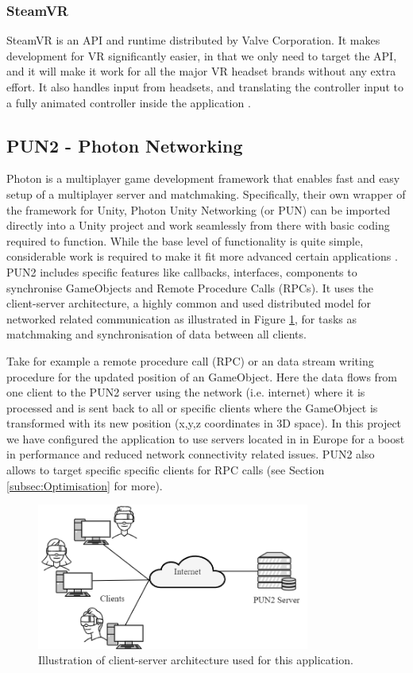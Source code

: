 \subsubsection{SteamVR}
SteamVR is an API and runtime distributed by Valve Corporation. It makes development for VR significantly easier, in that we only need to target the API, and it will make it work for all the major VR headset brands without any extra effort. It also handles input from headsets, and translating the controller input to a fully animated controller inside the application \cite{steamVR}\cite{steamVRAPI}.

\subsection{PUN2 - Photon Networking}
\label{section:pun2}
Photon is a multiplayer game development framework that enables fast and easy setup of a multiplayer server and matchmaking. Specifically, their own wrapper of the framework for Unity, Photon Unity Networking (or PUN) can be imported directly into a Unity project and work seamlessly from there with basic coding required to function. While the base level of functionality is quite simple, considerable work is required to make it fit more advanced certain applications \cite{PUN}. PUN2 includes specific features like callbacks, interfaces, components to synchronise GameObjects and Remote Procedure Calls (RPCs). It uses the client-server architecture, a highly common and used distributed model for networked related communication as illustrated in Figure \ref{fig:ClientServer}, for tasks as matchmaking and synchronisation of data between all clients. 

Take for example a remote procedure call (RPC) or an data stream writing procedure for the updated position of an GameObject. Here the data flows from one client to the PUN2 server using the network (i.e. internet) where it is processed and is sent back to all or specific clients where the GameObject is transformed with its new position (x,y,z coordinates in 3D space). In this project we have configured the application to use servers located in in Europe for a boost in performance and reduced network connectivity related issues. PUN2 also allows to target specific specific clients for RPC calls (see Section \ref{subsec:Optimisation} for more). 

\begin{figure}[!ht]
    \centering
    \includegraphics[width=0.8\textwidth]{./fig/background/ClientServer.png}
    \caption{Illustration of client-server architecture used for this application. }
    \label{fig:ClientServer}
\end{figure}

